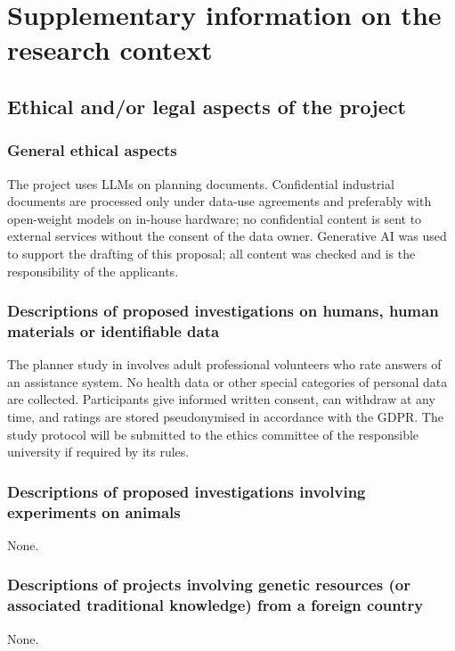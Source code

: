 \section{Supplementary information on the research context}

\subsection{Ethical and/or legal aspects of the project}

\subsubsection{General ethical aspects}
The project uses \acp{LLM} on planning documents. Confidential industrial documents are processed only under data-use agreements and preferably with open-weight models on in-house hardware; no confidential content is sent to external services without the consent of the data owner. Generative AI was used to support the drafting of this proposal; all content was checked and is the responsibility of the applicants. 

\subsubsection{Descriptions of proposed investigations on humans, human materials or identifiable data}
The planner study in  involves adult professional volunteers who rate answers of an assistance system. No health data or other special categories of personal data are collected. Participants give informed written consent, can withdraw at any time, and ratings are stored pseudonymised in accordance with the GDPR. The study protocol will be submitted to the ethics committee of the responsible university if required by its rules. 

\subsubsection{Descriptions of proposed investigations involving experiments on animals}
None.

\subsubsection{Descriptions of projects involving genetic resources (or associated traditional knowledge) from a foreign country}
None.

